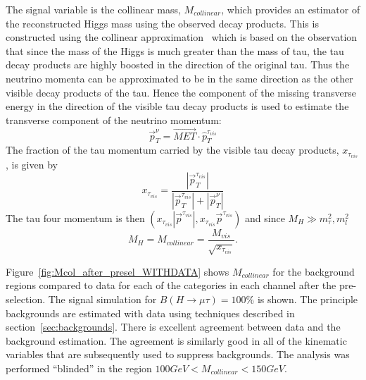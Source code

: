The signal variable is the collinear mass, $M_{collinear}$, which provides an estimator of the reconstructed Higgs mass using the observed
decay products. This is constructed using the collinear approximation~\cite{Ellis:1987xu} which is based on
the observation that since the mass of the Higgs  is much greater than the mass of tau, the tau decay products are highly
boosted in the direction of the original tau. Thus the neutrino momenta  can be approximated to be in the same direction as
the other visible decay products of the tau. Hence the component of the missing transverse energy in the direction of the
visible tau decay products is used to estimate the transverse component of the neutrino momentum:
\begin{equation*}
\vec{p}_{T}^{\nu}=\vec{MET}\cdot\hat{p}_{T}^{\tau_{vis}}
\end{equation*}
The fraction of the tau momentum carried by the visible tau decay products, $x_{\tau_{vis}}$, is given by
\begin{equation*}
x_{\tau_{vis}}=\frac{|\vec{p}_{T}^{\tau_{vis}}|}{|\vec{p}_{T}^{\tau_{vis}}|+|\vec{p}_{T}^{\nu}|}
\end{equation*}
The tau four momentum is then $(x_{\tau_{vis}}|\vec{p}^{\tau_{vis}}|,x_{\tau_{vis}}\vec{p}^{\tau_{vis}})$ and since
$M_{H} \gg m_{\tau}^{2},m_{l}^{2} $
\begin{equation*}
M_{H}=M_{collinear}=\frac{M_{vis}}{\sqrt{x_{\tau_{vis}}}}.
\end{equation*}

Figure~\ref{fig:Mcol_after_presel_WITHDATA} shows $M_{collinear}$ for the background regions compared to data for each of the
categories in each channel after the pre-selection. The signal simulation for $B(H \rightarrow \mu \tau )=100\%$ is shown. The principle backgrounds are estimated with data using techniques described in
section~\ref{sec:backgrounds}.  There is excellent agreement between data and the background estimation. The agreement is similarly good in all of the kinematic variables that are subsequently used to suppress backgrounds. The analysis was performed ``blinded'' in the region $100 GeV < M_{collinear} < 150 GeV$.


